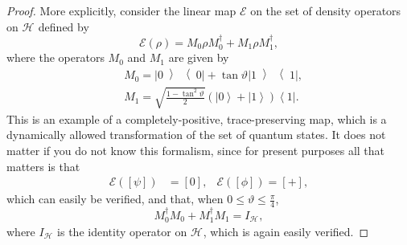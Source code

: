 \documentclass[DIV=calc,paper=a4,fontsize=11pt,twocolumn]{scrartcl} %
\theoremstyle{definition}
\theoremstyle{plain}
\newcommand{\Ket}[1]{\ensuremath{\left \vert #1 \right \rangle}}
\newcommand{\Bra}[1]{\ensuremath{\left \langle #1 \right \vert}}
\newcommand{\KetBra}[2]{\ensuremath{\left \vert #1 \middle \rangle
\middle \langle #2 \right \vert}}
\newcommand{\Proj}[1]{\ensuremath{\left [ #1 \right ]}}
\newcommand{\Hilb}[1][]{\ensuremath{\mathcal{H}_{#1}}}
\begin{document}
\begin{proof}
More explicitly, consider the linear map $\mathcal{E}$ on the set of
density operators on $\Hilb$ defined by
\begin{equation}
\mathcal{E}(\rho) = M_0 \rho M_0^{\dagger} + M_1 \rho M_1^{\dagger},
\end{equation}
where the operators $M_0$ and $M_1$ are given by
\begin{align}
& M_0 = \KetBra{0}{0} + \tan \vartheta \KetBra{1}{1},\\
& M_1 = \sqrt{\frac{1 - \tan^2 \vartheta}{2}}\left ( \Ket{0} + \Ket{1} \right ) \Bra{1}.
\end{align}
This is an example of a completely-positive, trace-preserving map,
which is a dynamically allowed transformation of the set of quantum
states.  It does not matter if you do not know this formalism, since
for present purposes all that matters is that
\begin{align}
\label{eq:Main:incip}
\mathcal{E}(\Proj{\psi}) & = \Proj{0}, & \mathcal{E}(\Proj{\phi})
= \Proj{+},
\end{align}
which can easily be verified, and that, when $0 \leq \vartheta \leq
\frac{\pi}{4}$,
\begin{equation}
\label{eq:Main:idsum}
M_0^{\dagger}M_0 + M_1^{\dagger}M_1 = I_{\Hilb},
\end{equation}
where $I_{\Hilb}$ is the identity operator on $\Hilb$, which is
again easily verified.


\end{proof}
\end{document}
